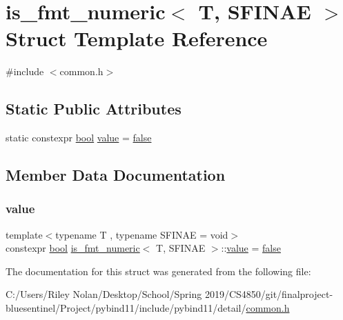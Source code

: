 \hypertarget{structis__fmt__numeric}{}\section{is\+\_\+fmt\+\_\+numeric$<$ T, S\+F\+I\+N\+AE $>$ Struct Template Reference}
\label{structis__fmt__numeric}


{\ttfamily \#include $<$common.\+h$>$}

\subsection*{Static Public Attributes}
\begin{DoxyCompactItemize}
\item 
static constexpr \mbox{\hyperlink{asdl_8h_af6a258d8f3ee5206d682d799316314b1}{bool}} \mbox{\hyperlink{structis__fmt__numeric_a2c75cb80b6eef5fa9f0b7fc186668c8c}{value}} = \mbox{\hyperlink{asdl_8h_af6a258d8f3ee5206d682d799316314b1ae9de385ef6fe9bf3360d1038396b884c}{false}}
\end{DoxyCompactItemize}


\subsection{Member Data Documentation}
\mbox{\label{structis__fmt__numeric_a2c75cb80b6eef5fa9f0b7fc186668c8c}} 
\subsubsection{\texorpdfstring{value}{value}}
{\footnotesize\ttfamily template$<$typename T , typename S\+F\+I\+N\+AE  = void$>$ \\
constexpr \mbox{\hyperlink{asdl_8h_af6a258d8f3ee5206d682d799316314b1}{bool}} \mbox{\hyperlink{structis__fmt__numeric}{is\+\_\+fmt\+\_\+numeric}}$<$ T, S\+F\+I\+N\+AE $>$\+::\mbox{\hyperlink{_s_d_l__opengl__glext_8h_a8ad81492d410ff2ac11f754f4042150f}{value}} = \mbox{\hyperlink{asdl_8h_af6a258d8f3ee5206d682d799316314b1ae9de385ef6fe9bf3360d1038396b884c}{false}}\hspace{0.3cm}{\ttfamily [static]}}



The documentation for this struct was generated from the following file\+:\begin{DoxyCompactItemize}
\item 
C\+:/\+Users/\+Riley Nolan/\+Desktop/\+School/\+Spring 2019/\+C\+S4850/git/finalproject-\/bluesentinel/\+Project/pybind11/include/pybind11/detail/\mbox{\hyperlink{detail_2common_8h}{common.\+h}}\end{DoxyCompactItemize}
